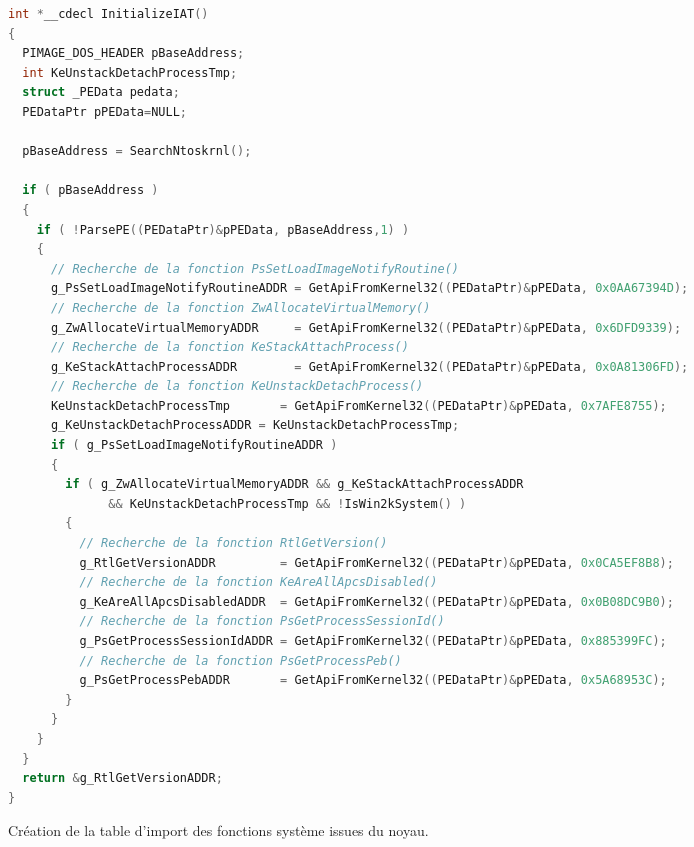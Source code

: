 \begin{figure}
\scriptsize
\begin{changemargin}{-1cm}{-1cm}
\begin{lstlisting}[language={C}]
int *__cdecl InitializeIAT()
{
  PIMAGE_DOS_HEADER pBaseAddress; 
  int KeUnstackDetachProcessTmp; 
  struct _PEData pedata;
  PEDataPtr pPEData=NULL; 

  pBaseAddress = SearchNtoskrnl();

  if ( pBaseAddress )
  {
    if ( !ParsePE((PEDataPtr)&pPEData, pBaseAddress,1) )
    {
      // Recherche de la fonction PsSetLoadImageNotifyRoutine()
      g_PsSetLoadImageNotifyRoutineADDR = GetApiFromKernel32((PEDataPtr)&pPEData, 0x0AA67394D); 
      // Recherche de la fonction ZwAllocateVirtualMemory()
      g_ZwAllocateVirtualMemoryADDR     = GetApiFromKernel32((PEDataPtr)&pPEData, 0x6DFD9339); 
      // Recherche de la fonction KeStackAttachProcess()
      g_KeStackAttachProcessADDR        = GetApiFromKernel32((PEDataPtr)&pPEData, 0x0A81306FD); 
      // Recherche de la fonction KeUnstackDetachProcess()
      KeUnstackDetachProcessTmp       = GetApiFromKernel32((PEDataPtr)&pPEData, 0x7AFE8755); 
      g_KeUnstackDetachProcessADDR = KeUnstackDetachProcessTmp;
      if ( g_PsSetLoadImageNotifyRoutineADDR )
      {
        if ( g_ZwAllocateVirtualMemoryADDR && g_KeStackAttachProcessADDR 
              && KeUnstackDetachProcessTmp && !IsWin2kSystem() )
        {
          // Recherche de la fonction RtlGetVersion()
          g_RtlGetVersionADDR         = GetApiFromKernel32((PEDataPtr)&pPEData, 0x0CA5EF8B8); 
          // Recherche de la fonction KeAreAllApcsDisabled()
          g_KeAreAllApcsDisabledADDR  = GetApiFromKernel32((PEDataPtr)&pPEData, 0x0B08DC9B0);
          // Recherche de la fonction PsGetProcessSessionId()
          g_PsGetProcessSessionIdADDR = GetApiFromKernel32((PEDataPtr)&pPEData, 0x885399FC);  
          // Recherche de la fonction PsGetProcessPeb()
          g_PsGetProcessPebADDR       = GetApiFromKernel32((PEDataPtr)&pPEData, 0x5A68953C); 
        }
      }
    }
  }
  return &g_RtlGetVersionADDR;
}
\end{lstlisting}
\end{changemargin}
\caption{Création de la table d'import des fonctions système issues du noyau.\label{fig:AThierry_NtoskrnlIAT}}
\end{figure}


